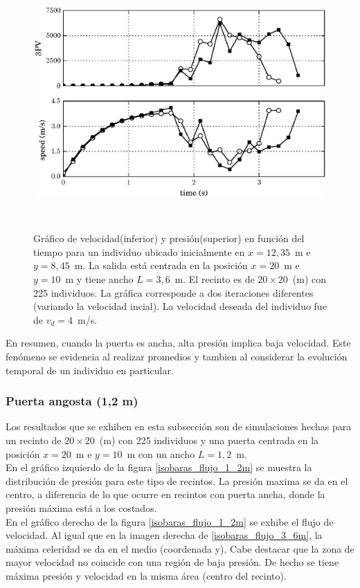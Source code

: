 \begin{figure}[H]
    \centering
    \includegraphics[height=9.7cm]{figuras/pv_vel_t_100_3_6.eps}
    \caption[width=5cm]{Gráfico de velocidad(inferior) y presión(superior) en función del tiempo para un individuo ubicado inicialmente en $x=12,35$~m e $y=8,45$~m.  La salida está centrada en la posición $x=20$~m e $y=10$~m y tiene ancho $L=3,6$~m. El recinto es de $20\times 20$~(m) con 225 individuos. La gráfica corresponde a dos iteraciones diferentes (variando la velocidad incial). La velocidad deseada del individuo fue de $v_d=4$~m/s.}
    \label{pv_vel_t_100_3_6}
\end{figure}

En resumen, cuando la puerta es ancha, alta presión implica baja velocidad. Este fenómeno se evidencia al realizar promedios y tambien al considerar la evolución temporal de un individuo en particular. 

\subsubsection{Puerta angosta (1,2 m)}

Los resultados que se exhiben en esta subsección son de simulaciones hechas para un recinto de  $20\times 20$~(m) con 225 individuos y una puerta centrada en la posición $x=20$~m e $y=10$~m con un ancho $L=1,2$~m.\\
En el gráfico izquierdo de la figura \ref{isobaras_flujo_1_2m} se muestra la distribución de presión para este tipo de recintos. La presión maxima se da en el centro, a diferencia de lo que ocurre en recintos con puerta ancha, donde la presión máxima está a los costados.\\
En el gráfico derecho de la figura \ref{isobaras_flujo_1_2m} se exhibe el flujo de velocidad. Al igual que en la imagen derecha de  \ref{isobaras_flujo_3_6m}, la máxima celeridad se da en el medio (coordenada y).
Cabe destacar que la zona de mayor velocidad no coincide con una región de baja presión. De hecho se tiene máxima presión y velocidad en la misma área (centro del recinto).  

